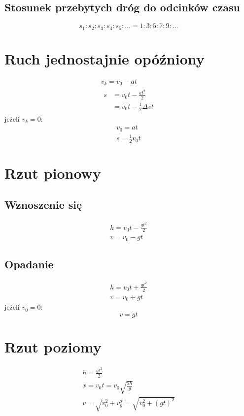 \subsection{Stosunek przebytych dróg do odcinków czasu}
\begin{equation*}
  s_1:s_2:s_3:s_4:s_5:\ldots = 1:3:5:7:9:\ldots
\end{equation*}

\section{Ruch jednostajnie opóźniony}
\begin{gather*}
  v_k = v_0 - at\\[0.8em]
  \begin{aligned}
    s &= v_0 t - \frac{a t^2}{2}\\
    &= v_0 t - \frac 1 2 \Delta vt
  \end{aligned}
\end{gather*}
jeżeli $v_k = 0$:
\begin{gather*}
  v_0 = at\\
  s = \frac 1 2 v_0 t
\end{gather*}

\section{Rzut pionowy}

\subsection{Wznoszenie się}
\begin{gather*}
  h = v_0 t - \frac{g t^2}{2}\\
  v = v_0 - gt
\end{gather*}

\subsection{Opadanie}
\begin{gather*}
  h = v_0t + \frac{gt^2}{2}\\
  v = v_0 + gt
\end{gather*}
jeżeli $v_0 = 0$:
\begin{equation*}
  v = gt
\end{equation*}

\section{Rzut poziomy}
\begin{gather*}
  h = \frac{g t^2}{2}\\
  x = v_0 t = v_0 \sqrt{\frac{2h}{g}}\\
  v = \sqrt{v_0^2 + v_y^2} = \sqrt{v_0^2 + (gt)^2}
\end{gather*}

